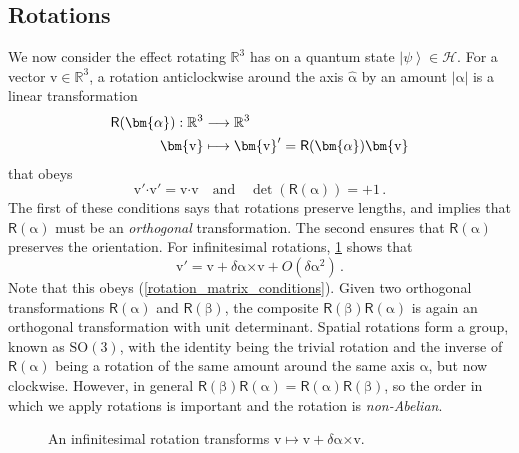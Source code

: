\documentclass{article}
\theoremstyle{plain}\theoremheaderfont{\normalfont\itshape}\theorembodyfont{\rmfamily}\theoremseparator{.}\newtheorem*{rem}{Remark}\newtheorem*{ex}{Example}\newtheorem*{proof}{Proof}\newtheorem*{altp}{Alternative proof}
\theoremstyle{plain}\theoremheaderfont{\normalfont\bfseries}\theorembodyfont{\rmfamily}\theoremseparator{.}\newtheorem{thm}{Theorem}[section]\newtheorem{lem}[thm]{Lemma}\newtheorem{prop}[thm]{Proposition}\newtheorem*{cor}{Corollary}\newtheorem{defn}[thm]{Definition}\newtheorem{clm}[thm]{Claim}\newtheorem{clminproof}{Claim}
\theoremstyle{break}\theoremheaderfont{\normalfont\itshape}\theorembodyfont{\rmfamily}\theoremseparator{.\medskip}\newtheorem*{proofskip}{Proof}\newtheorem*{exs}{Examples}\newtheorem*{rems}{Remarks}
\theoremstyle{break}\theoremheaderfont{\normalfont\bfseries}\theorembodyfont{\rmfamily}\theoremseparator{.\medskip}\newtheorem{lemskip}[thm]{Lemma}\newtheorem{defnskip}[thm]{Definition}\newtheorem{propskip}[thm]{Proposition}\newtheorem{thmskip}[thm]{Theorem}
\numberwithin{equation}{section}
\newcommand{\ket}[1]{\left| #1 \right\rangle}
\newcommand{\vb}[1]{\bm{\mathrm{#1}}}
\newcommand{\vu}[1]{\hat{\bm{\mathrm{#1}}}}
\newcommand{\cross}{\bm{\times}}
\newcommand{\vdot}{\bm{\cdot}}
\newcommand{\abs}[1]{\left| #1 \right|}
\newcommand{\hb}{\mathcal{H}}
\newcommand{\RR}{\mathbb{R}}
\newcommand{\SO}{\mathrm{SO}}
\begin{document}
    \subsection{Rotations}
    We now consider the effect rotating \(\RR^3\) has on a quantum state \(\ket{\psi}\in\hb\). For a vector \(\vb{v}\in\RR^3\), a rotation anticlockwise around the axis \(\vu{\alpha}\) by an amount \(\abs{\vb{\alpha}}\) is a linear transformation
    \begin{align}
        \mathsf{R}(\vb{\alpha}):\RR^3&\longrightarrow\RR^3\notag\\
        \vb{v}&\longmapsto\vb{v}'=\mathsf{R}(\vb{\alpha})\vb{v}
    \end{align}
    that obeys
    \begin{equation}\label{rotation_matrix_conditions}
        \vb{v}'\vdot\vb{v}'=\vb{v}\vdot\vb{v}\quad\text{and}\quad\det(\mathsf{R}(\vb{\alpha}))=+1\,.
    \end{equation}
    The first of these conditions says that rotations preserve lengths, and implies that \(\mathsf{R}(\vb{\alpha})\) must be an \textit{orthogonal} transformation. The second ensures that \(\mathsf{R}(\vb{\alpha})\) preserves the orientation. For infinitesimal rotations, \cref{Fig:infinitesimal_rotation} shows that
    \begin{equation}\label{infinitesimal_vector_rotation}
        \vb{v}'=\vb{v}+\delta\vb{\alpha}\cross\vb{v}+O(\delta\vb{\alpha}^2)\,.
    \end{equation}
    Note that this obeys (\ref{rotation_matrix_conditions}). Given two orthogonal transformations \(\mathsf{R}(\vb{\alpha})\) and \(\mathsf{R}(\vb{\beta})\), the composite \(\mathsf{R}(\vb{\beta})\mathsf{R}(\vb{\alpha})\) is again an orthogonal transformation with unit determinant. Spatial rotations form a group, known as \(\SO(3)\), with the identity being the trivial rotation and the inverse of \(\mathsf{R}(\vb{\alpha})\) being a rotation of the same amount around the same axis \(\vb{\alpha}\), but now clockwise. However, in general \(\mathsf{R}(\vb{\beta})\mathsf{R}(\vb{\alpha})=\mathsf{R}(\vb{\alpha})\mathsf{R}(\vb{\beta})\), so the order in which we apply rotations is important and the rotation is \textit{non-Abelian}.

    \begin{figure}
        \centering
        \caption{An infinitesimal rotation transforms \(\vb{v}\mapsto\vb{v}+\delta\vb{\alpha}\cross\vb{v}\).}
        \label{Fig:infinitesimal_rotation}
    \end{figure}
\end{document}
